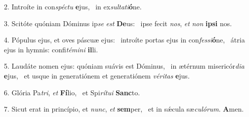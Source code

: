 2. Introíte in con\textit{spéc}\textit{tu} \textbf{e}jus, \ast\  in ex\textit{sul}\textit{ta}\textit{ti}\textbf{ó}ne.\

3. Scitóte quóniam Dóminus ip\textit{se} \textit{est} \textbf{De}us: \ast\  ipse fecit \textit{nos}, \textit{et} \textit{non} \textbf{ip}\textbf{si} nos.\

4. Pópulus ejus, et oves páscuæ ejus: \dag\  introíte portas ejus in con\textit{fes}\textit{si}\textbf{ó}ne, \ast\  átria ejus in hymnis: confi\textit{té}\textit{mi}\textit{ni} \textbf{il}li.\

5. Laudáte nomen ejus: quóniam suávis est Dóminus, \dag\  in ætérnum misericór\textit{di}\textit{a} \textbf{e}jus, \ast\  et usque in generatiónem et generatiónem \textit{vé}\textit{ri}\textit{tas} \textbf{e}jus.\

6. Glória Pa\textit{tri}, \textit{et} \textbf{Fí}lio, \ast\  et Spi\textit{rí}\textit{tu}\textit{i} \textbf{Sanc}to.\

7. Sicut erat in princípio, et \textit{nunc}, \textit{et} \textbf{sem}per, \ast\  et in sǽcula sæ\textit{cu}\textit{ló}\textit{rum}. \textbf{A}men.\

